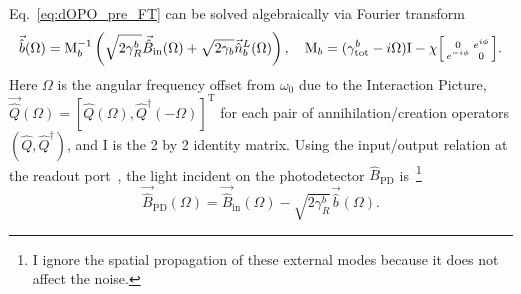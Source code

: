 Eq.~\ref{eq:dOPO_pre_FT} can be solved algebraically via Fourier transform~\cite{} %
\begin{equation}
\label{eq:dOPO_FT_vectorised}
\vec{\hat b}(\Omega)=\text{M}_b^{-1}\left(\sqrt{2\gamma^b_R}\vec{\hat{B}}_\mathrm{in}(\Omega) + \sqrt{2\gamma_b}\vec{\hat{n}}^L_b(\Omega)\right),\quad\text{M}_b=(\gamma^b_\mathrm{tot}-i \Omega)\text{I}-\chi \begin{bsmallmatrix}0 & e^{i\phi} \\e^{-i\phi} & 0\end{bsmallmatrix}.
\end{equation}
Here $\Omega$ is the angular frequency offset from $\omega_0$ due to the Interaction Picture, %
$\vec{\hat{Q}}(\Omega)=[\hat{Q}(\Omega),\hat{Q}^\dag(-\Omega)]^\text{T}$ for each pair of annihilation/creation operators $(\hat Q, \hat Q^\dag)$, and $\text{I}$  is the 2 by 2 identity matrix.
Using the input/output relation at the readout port~\cite{}, %
the light incident on the photodetector $\hat B_\text{PD}$ is~\footnote{I ignore the spatial propagation of these external modes because it does not affect the noise.} 
\begin{equation}
\label{eq:dOPO_IO}\vec{\hat{B}}_\mathrm{PD}(\Omega)=\vec{\hat{B}}_\mathrm{in}(\Omega)-\sqrt{2\gamma^b_R}\vec{\hat b}(\Omega).
\end{equation} 
